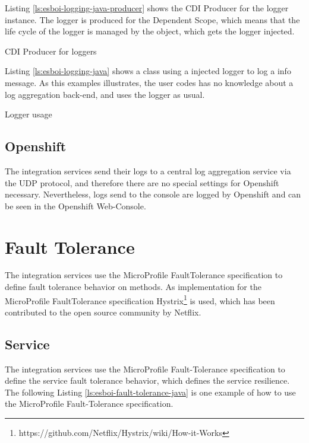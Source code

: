 Listing \vref{ls:esboi-logging-java-producer} shows the CDI Producer for the logger instance. The logger is produced for the Dependent Scope, which means that the life cycle of the logger is managed by the object, which gets the logger injected.

\begin{listing}
	\caption{CDI Producer for loggers}
	\label{ls:esboi-logging-java-producer}
\end{listing} 

Listing \vref{ls:esboi-logging-java} shows a class using a injected logger to log a info message. As this examples illustrates, the user codes has no knowledge about a log aggregation back-end, and uses the logger as usual.

\begin{listing}
	\caption{Logger usage}
	\label{ls:esboi-logging-java}
\end{listing} 

\subsection{Openshift}
\label{sec:esbi-logging-openshift}
The integration services send their logs to a central log aggregation service via the UDP protocol, and therefore there are no special settings for Openshift necessary. Nevertheless, logs send to the console are logged by Openshift and can be seen in the Openshift Web-Console.

\section{Fault Tolerance}
\label{sec:esbi-fault}
The integration services use the MicroProfile FaultTolerance specification to define fault tolerance behavior on methods. As implementation for the MicroProfile FaultTolerance specification  Hystrix\footnote{https://github.com/Netflix/Hystrix/wiki/How-it-Works} is used, which has been contributed to the open source community by Netflix.

\subsection{Service}
\label{sec:esbi-fault-service}
The integration services use the MicroProfile Fault-Tolerance specification to define the service fault tolerance behavior, which defines the service resilience. The following Listing \vref{ls:esboi-fault-tolerance-java} is one example of how to use the MicroProfile Fault-Tolerance specification.

